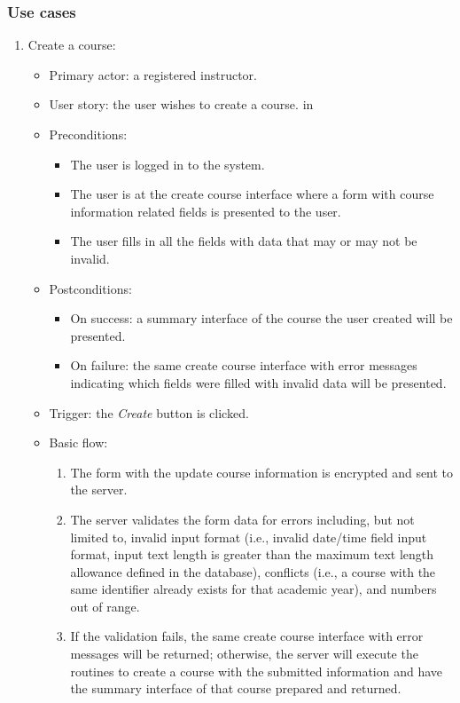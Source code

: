 \subsubsection{Use cases}
\begin{enumerate}
\item Create a course:
\begin{itemize}
    \item Primary actor: a registered instructor.
    \item User story: the user wishes to create a course.
     in
    \item Preconditions: 
        \begin{itemize}
            \item The user is logged in to the system.
            \item The user is at the create course interface where a form with
                course information related fields 
                is presented to the user.
            \item The user fills in all the fields with data that may or
                may not be invalid.
        \end{itemize}
    \item Postconditions:
        \begin{itemize}
            \item On success: a summary interface of the course the user created
                will be presented.
            \item On failure: the same create course interface with error
                messages indicating which fields were filled with invalid data
                will be presented.
        \end{itemize}
    \item Trigger: the \emph{Create} button is clicked.
    \item Basic flow:
        \begin{enumerate}
            \item The form with the update course information is encrypted and
                sent to the server.
            \item The server validates the form data for errors including,
                but not limited to,
                invalid input format
                (i.e., invalid date/time field input format,
                input text length is greater than the maximum text length
                allowance defined in the database),
                conflicts (i.e., a course with the same identifier  
                already exists for that academic year),
                and numbers out of range.
            \item If the validation fails, the same create course interface
                with error messages will be returned; otherwise, the server will
                execute the routines to create a course with the submitted 
                information and have the summary interface of that course prepared
                and returned.
        \end{enumerate}
\end{itemize}


\end{enumerate}
